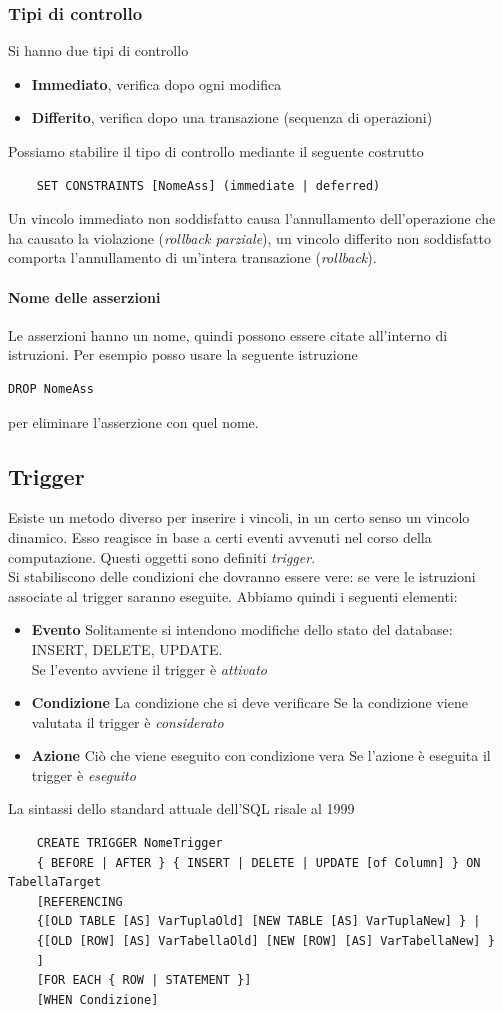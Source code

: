\subsubsection{Tipi di controllo} Si hanno due tipi di controllo
\begin{itemize}
	\item \textbf{Immediato}, verifica dopo ogni modifica
	\item \textbf{Differito}, verifica dopo una transazione (sequenza di operazioni)
\end{itemize}
Possiamo stabilire il tipo di controllo mediante il seguente costrutto
\begin{verbatim}
	SET CONSTRAINTS [NomeAss] (immediate | deferred)
\end{verbatim}
Un vincolo immediato non soddisfatto causa l'annullamento dell'operazione che ha causato la violazione (\emph{rollback parziale}), un vincolo differito non soddisfatto comporta l'annullamento di un'intera transazione (\emph{rollback}).
\paragraph{Nome delle asserzioni} Le asserzioni hanno un nome, quindi possono essere citate all'interno di istruzioni. Per esempio posso usare la seguente istruzione
\begin{verbatim}DROP NomeAss\end{verbatim} per eliminare l'asserzione con quel nome.
\subsection{Trigger}
Esiste un metodo diverso per inserire i vincoli, in un certo senso un vincolo dinamico. Esso reagisce in base a certi eventi avvenuti nel corso della computazione. Questi oggetti sono definiti \emph{trigger}.\\
Si stabiliscono delle condizioni che dovranno essere vere: se vere le istruzioni associate al trigger saranno eseguite. Abbiamo quindi i seguenti elementi:
\begin{itemize}
	\item \textbf{Evento} Solitamente si intendono modifiche dello stato del database: INSERT, DELETE, UPDATE. \\
	\small Se l'evento avviene il trigger è \emph{attivato} \normalsize
	\item \textbf{Condizione} La condizione che si deve verificare
	\small Se la condizione viene valutata il trigger è \emph{considerato} \normalsize
	\item \textbf{Azione} Ciò che viene eseguito con condizione vera
	\small Se l'azione è eseguita il trigger è \emph{eseguito} \normalsize
\end{itemize}
La sintassi dello standard attuale dell'SQL risale al 1999
\begin{verbatim}
	CREATE TRIGGER NomeTrigger
	{ BEFORE | AFTER } { INSERT | DELETE | UPDATE [of Column] } ON TabellaTarget
	[REFERENCING
	{[OLD TABLE [AS] VarTuplaOld] [NEW TABLE [AS] VarTuplaNew] } |
	{[OLD [ROW] [AS] VarTabellaOld] [NEW [ROW] [AS] VarTabellaNew] }
	]
	[FOR EACH { ROW | STATEMENT }]
	[WHEN Condizione]
\end{verbatim}
